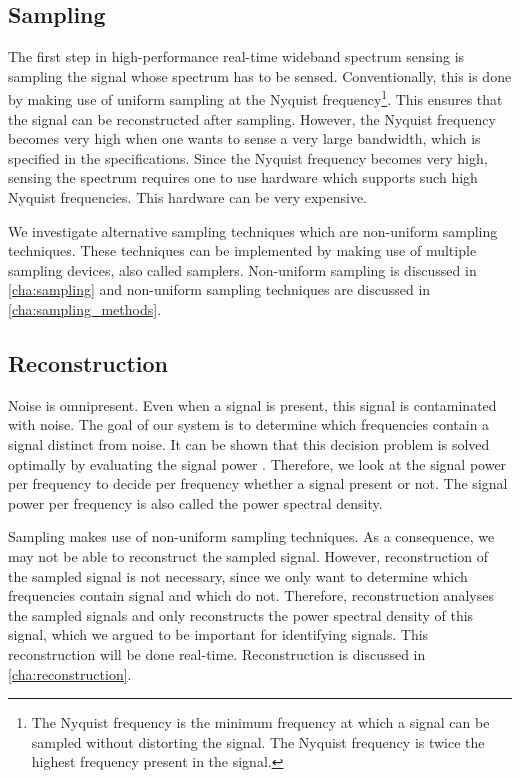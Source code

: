 \documentclass[a4paper, openany, oneside]{memoir}
\begin{document}
\subsection{Sampling}
The first step in high-performance real-time wideband spectrum sensing is sampling the signal whose spectrum has to be sensed. Conventionally, this is done by making use of uniform sampling at the Nyquist frequency\footnote{The Nyquist frequency is the minimum frequency at which a signal can be sampled without distorting the signal. The Nyquist frequency is twice the highest frequency present in the signal.}. This ensures that the signal can be reconstructed after sampling. However, the Nyquist frequency becomes very high when one wants to sense a very large bandwidth, which is specified in the specifications. Since the Nyquist frequency becomes very high, sensing the spectrum requires one to use hardware which supports such high Nyquist frequencies. This hardware can be very expensive.

We investigate alternative sampling techniques which are non-uniform sampling techniques. These techniques can be implemented by making use of multiple sampling devices, also called samplers. Non-uniform sampling is discussed in \cref{cha:sampling} and non-uniform sampling techniques are discussed in \cref{cha:sampling_methods}.

\subsection{Reconstruction}
Noise is omnipresent. Even when a signal is present, this signal is contaminated with noise. The goal of our system is to determine which frequencies contain a signal distinct from noise. It can be shown that this decision problem is solved optimally by evaluating the signal power \cite{axell2012spectrum}. Therefore, we look at the signal power per frequency to decide per frequency whether a signal present or not. The signal power per frequency is also called the power spectral density.

Sampling makes use of non-uniform sampling techniques. As a consequence, we may not be able to reconstruct the sampled signal. However, reconstruction of the sampled signal is not necessary, since we only want to determine which frequencies contain signal and which do not. Therefore, reconstruction analyses the sampled signals and only reconstructs the power spectral density of this signal, which we argued to be important for identifying signals. This reconstruction will be done real-time. Reconstruction is discussed in \cref{cha:reconstruction}.
\end{document}
